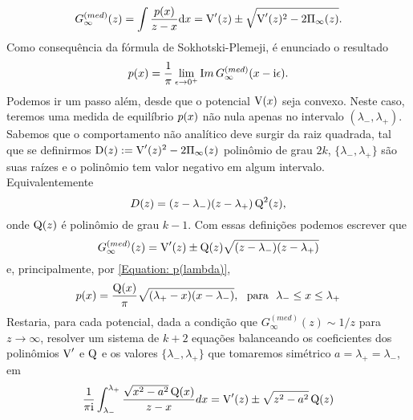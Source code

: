 \begin{equation}
	G^{(med)}_{\infty}(z) = \int \frac{p(x)}{z - x} \dd x= \operatorname{V}'(z) \pm \sqrt{\operatorname{V}'(z)^2 - 2 \Pi_{\infty}(z) }.
	\label{Equation: Resolvent}
\end{equation}
Como consequência da fórmula de Sokhotski-Plemeji, é enunciado o resultado 
\begin{equation}
	p(x) = \frac{1}{\pi} \lim_{\epsilon \to 0^+} \mathop{\textrm Im}{G_{\infty}^{(med)}(x - \mathrm{i}\epsilon)}.
	\label{Equation: p(lambda)}
\end{equation}
Podemos ir um passo além, desde que o potencial $\operatorname{V}(x)$ seja convexo. Neste caso, teremos uma medida de equilíbrio $p(x)$ não nula apenas no intervalo $(\lambda_{-}, \lambda_{+})$. Sabemos que o comportamento não analítico deve surgir da raiz quadrada, tal que se definirmos $\operatorname{D}(z) := \operatorname{V}'(z)^2 - 2 \Pi_{\infty}(z)$ polinômio de grau $2k$, $\{\lambda_{-}, \lambda_{+}\}$ são suas raízes e o polinômio tem valor negativo em algum intervalo. Equivalentemente $$D(z) = (z-\lambda_{-})(z - \lambda_{+}) \operatorname{Q}^2(z),$$ onde $\operatorname{Q}(z)$ é polinômio de grau $k-1$. Com essas definições podemos escrever que $$G_{\infty}^{(med)}(z) = \operatorname{V}'(z) \pm \operatorname{Q}(z) \sqrt{(z - \lambda_{-})(z - \lambda_{+})}$$ e, principalmente, por \ref{Equation: p(lambda)},
\begin{equation}
	p(x) =\frac{\operatorname{Q}(x)}{\pi} \sqrt{(\lambda_{+} - x)(x - \lambda_{-})}, \ \ \text{para} \ \  \lambda_{-} \leq x \leq \lambda_{+}
\end{equation}
Restaria, para cada potencial, dada a condição que $G_{\infty}^{(med)}(z) \sim 1/z$ para $z \rightarrow \infty$, resolver um sistema de $k+2$ equações balanceando os coeficientes dos polinômios $\operatorname{V}'$ e $\operatorname{Q}$ e os valores $\{\lambda_{-}, \lambda_{+}\}$ que tomaremos simétrico $a = \lambda_{+} = \lambda_{-}$, em
\[
\frac{1}{\pi \mathrm{i}} \int_{\lambda_{-}}^{\lambda_{+}} \frac{\sqrt{x^2 - a^2}\operatorname{Q}(x)}{z-x} dx = \operatorname{V}'(z) \pm \sqrt{z^2 - a^2}\operatorname{Q}(z) 
\]


